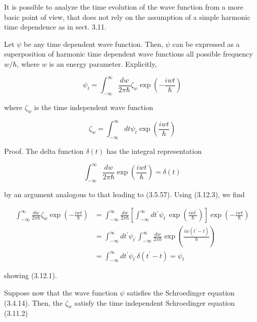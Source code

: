 \documentclass{article}
\begin{document}
It is possible to analyze the time evolution of the wave function from a more basic point of view, that does not rely on the assumption of a simple harmonic time dependence as in sect. 3.11.

Let $\psi$ be any time dependent wave function. Then, $\psi$ can be expressed as a superposition of harmonic time dependent wave functions all possible frequency $w / \hbar$, where $w$ is an energy parameter. Explicitly,
 
\begin{equation*}
\psi_{t}=\int_{-\infty}^{\infty} \frac{d w}{2 \pi \hbar} \zeta_{w} \exp \left(-\frac{i w t}{\hbar}\right) \tag{3.12.1}
\end{equation*}
 
where $\zeta_{w}$ is the time independent wave function
 
\begin{equation*}
\zeta_{w}=\int_{-\infty}^{\infty} d t \psi_{t} \exp \left(\frac{i w t}{\hbar}\right) \tag{3.12.2}
\end{equation*}
 

Proof. The delta function $\delta(t)$ has the integral representation
 
\begin{equation*}
\int_{-\infty}^{\infty} \frac{d w}{2 \pi \hbar} \exp \left(\frac{i w t}{\hbar}\right)=\delta(t) \tag{3.12.3}
\end{equation*}
 
by an argument analogous to that leading to (3.5.57). Using (3.12.3), we find
 
\begin{align*}
\int_{-\infty}^{\infty} \frac{d w}{2 \pi \hbar} \zeta_{w} \exp \left(-\frac{i w t}{\hbar}\right) & =\int_{-\infty}^{\infty} \frac{d w}{2 \pi \hbar}\left[\int_{-\infty}^{\infty} d t^{\prime} \psi_{t^{\prime}} \exp \left(\frac{i w t^{\prime}}{\hbar}\right)\right] \exp \left(-\frac{i w t}{\hbar}\right) \\
& =\int_{-\infty}^{\infty} d t^{\prime} \psi_{t^{\prime}} \int_{-\infty}^{\infty} \frac{d w}{2 \pi \hbar} \exp \left(\frac{i w\left(t^{\prime}-t\right)}{\hbar}\right)  \tag{3.12.4}\\
& =\int_{-\infty}^{\infty} d t^{\prime} \psi_{t^{\prime}} \delta\left(t^{\prime}-t\right)=\psi_{t}
\end{align*}
 
showing (3.12.1).

Suppose now that the wave function $\psi$ satisfies the Schroedinger equation (3.4.14). Then, the $\zeta_{w}$ satisfy the time independent Schroedinger equation (3.11.2)
 
\end{document}
